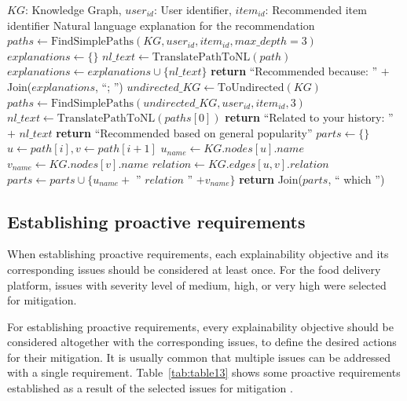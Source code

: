 \documentclass[conference]{IEEEtran}
\begin{document}
\begin{algorithm}[!t]
\caption{Explanation Generation via KG Path Finding}
\label{alg:explanation_generation}
\small
\begin{algorithmic}[1]
\Require $KG$: Knowledge Graph, $user_{id}$: User identifier, $item_{id}$: Recommended item identifier
\Ensure Natural language explanation for the recommendation
\State $paths \gets \text{FindSimplePaths}(KG, user_{id}, item_{id}, max\_depth=3)$
  \State $explanations \gets \{\}$
    \State $nl\_text \gets \text{TranslatePathToNL}(path)$
    \State $explanations \gets explanations \cup \{nl\_text\}$
  \EndFor
  \State \textbf{return} ``Recommended because: '' $+$ Join($explanations$, ``; '')
\Else
  \State $undirected\_KG \gets \text{ToUndirected}(KG)$
  \State $paths \gets \text{FindSimplePaths}(undirected\_KG, user_{id}, item_{id}, 3)$
    \State $nl\_text \gets \text{TranslatePathToNL}(paths[0])$
    \State \textbf{return} ``Related to your history: '' $+$ $nl\_text$
  \Else
    \State \textbf{return} ``Recommended based on general popularity''
  \EndIf
\EndIf
{}
  \State $parts \gets \{\}$
    \State $u \gets path[i], v \gets path[i+1]$
    \State $u_{name} \gets KG.nodes[u].name$
    \State $v_{name} \gets KG.nodes[v].name$
    \State $relation \gets KG.edges[u,v].relation$
    \State $parts \gets parts \cup \{u_{name} + $ '' $relation$ '' $+ v_{name}\}$
  \EndFor
  \State \textbf{return} Join($parts$, `` which '')
\EndFunction
\end{algorithmic}
\end{algorithm}

\subsection{Establishing proactive requirements}
When establishing proactive requirements, each explainability objective and its corresponding issues should be considered at least once. For the food delivery platform, issues with severity level of medium, high, or very high were selected for mitigation.

For establishing proactive requirements, every explainability objective should be considered altogether with the corresponding issues, to define the desired actions for their mitigation. It is usually common that multiple issues can be addressed with a single requirement. Table~\ref{tab:table13} shows some proactive requirements established as a result of the selected issues for mitigation \cite{ref1}.
\end{document}
